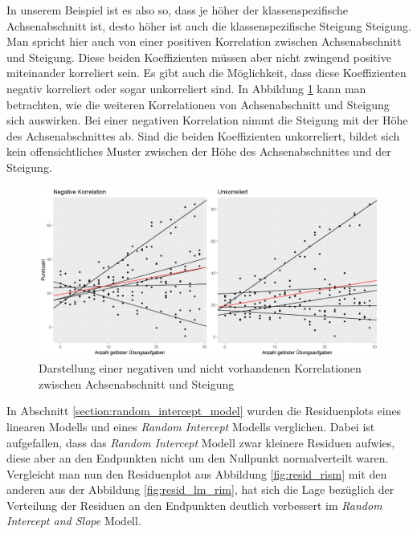\documentclass[12pt]{article}\usepackage[]{graphicx}\usepackage[]{color}
\begin{document}
In unserem Beispiel ist es also so, dass je höher der klassenspezifische Achsenabschnitt ist, desto höher ist auch die klassenspezifische Steigung Steigung. Man spricht hier auch von einer positiven Korrelation zwischen Achsenabschnitt und Steigung. Diese beiden Koeffizienten müssen aber nicht zwingend positive miteinander korreliert sein. Es gibt auch die Möglichkeit, dass diese Koeffizienten negativ korreliert oder sogar unkorreliert sind. In Abbildung \ref{fig:corr_s_i} kann man betrachten, wie die weiteren Korrelationen von Achsenabschnitt und Steigung sich auswirken. Bei einer negativen Korrelation nimmt die Steigung mit der Höhe des Achsenabschnittes ab. Sind die beiden Koeffizienten unkorreliert, bildet sich kein offensichtliches Muster zwischen der Höhe des Achsenabschnittes und der Steigung.

\begin{figure}[ht!]
\centering
\includegraphics[width = \textwidth]{corr_s_i}
\caption{Darstellung einer negativen und nicht vorhandenen Korrelationen zwischen Achsenabschnitt und Steigung}
\label{fig:corr_s_i}
\end{figure}

In Abschnitt \ref{section:random_intercept_model} wurden die Residuenplots eines linearen Modells und eines \textit{Random Intercept} Modells verglichen. Dabei ist aufgefallen, dass das \textit{Random Intercept} Modell zwar kleinere Residuen aufwies, diese aber an den Endpunkten nicht um den Nullpunkt normalverteilt waren. Vergleicht man nun den Residuenplot aus Abbildung \ref{fig:resid_rism} mit den anderen aus der Abbildung \ref{fig:resid_lm_rim}, hat sich die Lage bezüglich der Verteilung der Residuen an den Endpunkten deutlich verbessert im \textit{Random Intercept and Slope} Modell.
 
\end{document}
